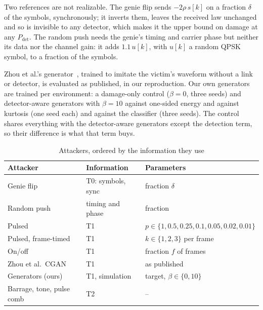 Two references are not realizable.
The genie flip sends $-2\rho\,s[k]$ on a fraction $\delta$ of the symbols, synchronously; it inverts them, leaves the received law unchanged and so is invisible to any detector, which makes it the upper bound on damage at any $P_{\mathrm{det}}$.
The random push needs the genie's timing and carrier phase but neither its data nor the channel gain: it adds $1.1\,u[k]$, with $u[k]$ a random QPSK symbol, to a fraction of the symbols.

Zhou et al.'s generator~\cite{11184988}, trained to imitate the victim's waveform without a link or detector, is evaluated as published, in our reproduction.
Our own generators are trained per environment: a damage-only control ($\beta=0$, three seeds) and detector-aware generators with $\beta=10$ against one-sided energy and against kurtosis (one seed each) and against the classifier (three seeds).
The control shares everything with the detector-aware generators except the detection term, so their difference is what that term buys.

\begin{table}[t]
\caption{Attackers, ordered by the information they use}\label{tab:attackers}
\centering\footnotesize
\begin{tabular}{@{}lll@{}}
\toprule
Attacker & Information & Parameters \\
\midrule
Genie flip & T0: symbols, sync & fraction $\delta$ \\
Random push & timing and phase & fraction \\
Pulsed~\cite{amuru2015optimal} & T1 & $p\in\{1,0.5,0.25,0.1,0.05,0.02,0.01\}$ \\
Pulsed, frame-timed & T1 & $k\in\{1,2,3\}$ per frame \\
On/off & T1 & fraction $f$ of frames \\
Zhou et al.\ CGAN~\cite{11184988} & T1 & as published \\
Generators (ours) & T1, simulation & target, $\beta\in\{0,10\}$ \\
Barrage, tone, pulse comb~\cite{li2022jamming_ofdm} & T2 & -- \\
\bottomrule
\end{tabular}
\end{table}


